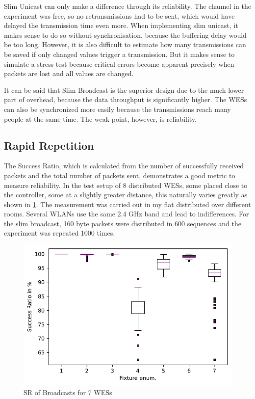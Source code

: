 Slim Unicast can only make a difference through its reliability.
The channel in the experiment was free, so no retransmissions had to be sent, which would have delayed the transmission time even more.
When implementing slim unicast, it makes sense to do so without synchronisation, because the buffering delay would be too long.
However, it is also difficult to estimate how many transmissions can be saved if only changed values trigger a transmission.
But it makes sense to simulate a stress test because critical errors become apparent precisely
when packets are lost and all values are changed.

It can be said that Slim Broadcast is the superior design due to the much lower part of overhead, 
because the data throughput is significantly higher.
The WESs can also be synchronized more easily because the transmissions reach many people at the same time.
The weak point, however, is reliability.

\subsection*{Rapid Repetition}

The Success Ratio, which is calculated from the number of successfully received packets 
and the total number of packets sent, demonstrates a good metric to measure reliability.
In the test setup of 8 distributed WESs, some placed close to the controller, 
some at a slightly greater distance,
this naturally varies greatly as shown in \cref{fig:sr_broadcast}.
The measurement was carried out in my flat distributed over different rooms.
Several WLANs use the same 2.4 GHz band and lead to indifferences.
For the slim broadcast, 160 byte packets were distributed in 600 sequences and 
the experiment was repeated 1000 times.

\begin{figure}[h]
	\centering
	\includegraphics[scale=0.6]{../Plot2/Graphs/SR_per_fixture_broadcast.pdf}
	\caption{SR of Broadcasts for 7 WESs}
	\label{fig:sr_broadcast}
\end{figure}

